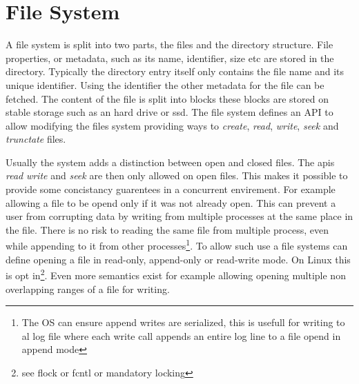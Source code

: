 \section{File System}
A file system is split into two parts, the files and the directory structure. File properties, or metadata, such as its name, identifier, size etc are stored in the directory. Typically the directory entry itself only contains the file name and its unique identifier. Using the identifier the other metadata for the file can be fetched. The content of the file is split into blocks these blocks are stored on stable storage such as an hard drive or ssd. The file system defines an API to allow modifying the files system providing ways to \textit{create}, \textit{read}, \textit{write}, \textit{seek} and \textit{trunctate} files. 

Usually the system adds a distinction between open and closed files. The apis \textit{read} \textit{write} and \textit{seek} are then only allowed on open files. This makes it possible to provide some concistancy guarentees in a concurrent envirement. For example allowing a file to be opend only if it was not already open. This can prevent a user from corrupting data by writing from multiple processes at the same place in the file. There is no risk to reading the same file from multiple process, even while appending to it from other processes\footnote{The OS can ensure append writes are serialized, this is usefull for writing to al log file where each write call appends an entire log line to a file opend in append mode}. To allow such use a file systems can define opening a file in read-only, append-only or read-write mode. On Linux this is opt in\footnote{see flock or fcntl or mandatory locking}. Even more semantics exist for example allowing opening multiple non overlapping ranges of a file for writing. 

